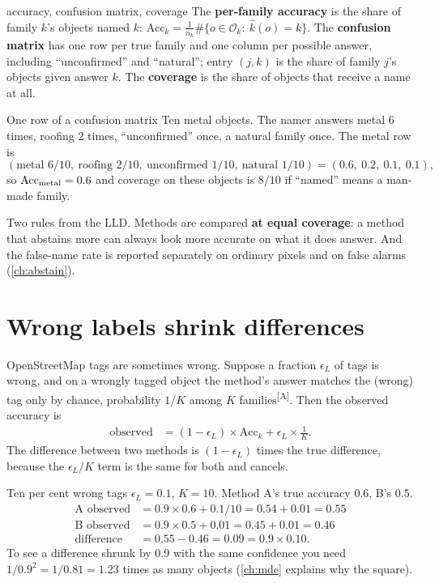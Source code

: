 \documentclass[11pt,a4paper,oneside,openany]{book}
\newcommand{\assm}{\textsuperscript{\textsf{\scriptsize[A]}}}
\begin{document}
\begin{defn}{accuracy, confusion matrix, coverage}
The \textbf{per-family accuracy} is the share of family $k$'s objects named $k$:
$\mathrm{Acc}_k=\frac1{n_k}\#\{o\in\mathcal O_k:\ \hat k(o)=k\}$. The \textbf{confusion matrix} has one row per true family and one column per possible answer, including
``unconfirmed'' and ``natural''; entry $(j,k)$ is the share of family $j$'s objects given answer $k$. The \textbf{coverage} is the share of objects that receive a name at all.
\end{defn}

\begin{worked}[label=we:confusion]{One row of a confusion matrix}
Ten metal objects. The namer answers metal 6 times, roofing 2 times, ``unconfirmed'' once, a natural family once. The metal row is
\[
  (\text{metal } 6/10,\ \text{roofing } 2/10,\ \text{unconfirmed } 1/10,\ \text{natural } 1/10)=(0.6,\ 0.2,\ 0.1,\ 0.1),
\]
so $\mathrm{Acc}_{\rm metal}=0.6$ and coverage on these objects is $8/10$ if ``named'' means a man-made family.
\end{worked}

Two rules from the LLD. Methods are compared \textbf{at equal coverage}: a method that abstains more can always look more accurate on what it does answer. And the false-name
rate is reported separately on ordinary pixels and on false alarms (\cref{ch:abstain}).

\section{Wrong labels shrink differences}

OpenStreetMap tags are sometimes wrong. Suppose a fraction $\epsilon_L$ of tags is wrong, and on a wrongly tagged object the method's answer matches the (wrong) tag only by chance,
probability $1/K$ among $K$ families\assm. Then the observed accuracy is
\begin{align*}
\text{observed} &= (1-\epsilon_L)\times\mathrm{Acc}_k+\epsilon_L\times\frac1K .
\end{align*}
The difference between two methods is $(1-\epsilon_L)$ times the true difference, because the $\epsilon_L/K$ term is the same for both and cancels.

\begin{worked}[label=we:labelnoise]{Ten per cent wrong tags}
$\epsilon_L=0.1$, $K=10$. Method A's true accuracy 0.6, B's 0.5.
\begin{align*}
\text{A observed} &= 0.9\times0.6+0.1/10=0.54+0.01=0.55\\
\text{B observed} &= 0.9\times0.5+0.01=0.45+0.01=0.46\\
\text{difference} &= 0.55-0.46=0.09=0.9\times0.10 .
\end{align*}
To see a difference shrunk by 0.9 with the same confidence you need $1/0.9^2=1/0.81=1.23$ times as many objects (\cref{ch:mde} explains why the square).
\end{worked}
\end{document}
